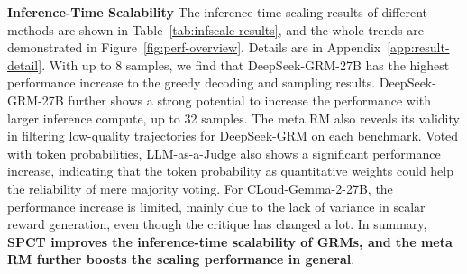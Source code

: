 \documentclass{article} %
\newcommand{\SGRM}{DeepSeek-GRM-27B\xspace}
\newcommand{\SGRMAll}{DeepSeek-GRM\xspace}
\begin{document}
\noindent\textbf{Inference-Time Scalability}
The inference-time scaling results of different methods are shown in Table~\ref{tab:infscale-results}, and the whole trends are demonstrated in Figure~\ref{fig:perf-overview}. Details are in Appendix~\ref{app:result-detail}. With up to 8 samples, we find that \SGRM has the highest performance increase to the greedy decoding and sampling results. \SGRM further shows a strong potential to increase the performance with larger inference compute, up to 32 samples. The meta RM also reveals its validity in filtering low-quality trajectories for \SGRMAll on each benchmark. 
Voted with token probabilities, LLM-as-a-Judge also shows a significant performance increase, indicating that the token probability as quantitative weights could help the reliability of mere majority voting. For CLoud-Gemma-2-27B, the performance increase is limited, mainly due to the lack of variance in scalar reward generation, even though the critique has changed a lot. In summary, \textbf{SPCT improves the inference-time scalability of GRMs, and the meta RM further boosts the scaling performance in general}. 
\end{document}
